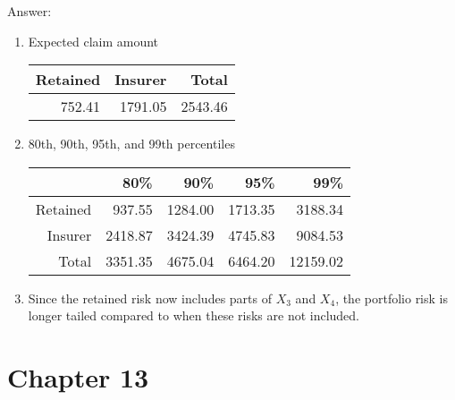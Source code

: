 \documentclass[11pt,a4paper,onecolumn]{article}
\begin{document}
\begin{enumerate}
Answer:
\begin{enumerate}
	\item    Expected claim amount
	\begin{table}[H]
		\centering
		\begin{tabular}{rrr}
			\hline
			Retained & Insurer & Total \\
			\hline
			 752.41 & 1791.05 & 2543.46 \\
			\hline
		\end{tabular}
	\end{table}
\item   80th, 90th, 95th, and 99th percentiles
\begin{table}[H]
	\centering
	\begin{tabular}{rrrrr}
		\hline
		&  80\% & 90\% & 95\% & 99\% \\
		\hline
		Retained & 937.55 & 1284.00 & 1713.35 & 3188.34 \\
		Insurer & 2418.87 & 3424.39 & 4745.83 & 9084.53 \\
		Total & 3351.35 & 4675.04 & 6464.20 & 12159.02 \\
		\hline
	\end{tabular}
\end{table}
\item Since the retained risk now includes parts of $X_3$ and $X_4$, the portfolio risk is longer tailed compared to when these risks are not included.
\end{enumerate}
\end{enumerate}

\section{Chapter 13}
\end{document}
